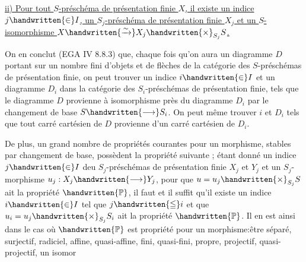 \uline{ii) Pour tout $S$-préschéma de présentation finie $X$, il existe un indice $j\handwritten{\in}I$,  un $S_j$-préschéma de présentation finie $X_j$ et un $S$-isomorphisme $X\handwritten{\xrightarrow{\sim}}X_j\handwritten{\times}_{S_j}S$.}

On en conclut (EGA IV 8.8.3) que, chaque fois qu'on aura un diagramme $D$ portant sur un nombre fini d'objets et de flèches de la catégorie des $S$-préschémas de présentation finie, on peut trouver un indice $i\handwritten{\in}I$ et un diagramme $D_i$ dans la catégorie des $S_i$-préschémas de présentation finie, tels que le diagramme $D$ provienne à isomorphisme près du diagramme $D_i$ par le changement de base $S\handwritten{\longrightarrow}S_i$. On peut même trouver $i$ et $D_i$ tels que tout carré cartésien de $D$ provienne d'un carré cartésien de $D_i$.

 De plus, un grand nombre de propriétés  courantes pour un morphisme, stables par changement de base, possèdent la propriété suivante ; étant donné un indice $j\handwritten{\in}I$ deu $S_j$-préschémas de présentation finie $X_j$ et $Y_j$ et un $S_j$-morphisme $u_j:X_j\handwritten{\longrightarrow}Y_j$, pour que $u=u_j\handwritten{\times}_{S_j}S$ ait la propriété $\handwritten{\mathbb{P}}$, il faut et il suffit qu'il existe un indice $i\handwritten{\in}I$ tel que $j\handwritten{\leqq}i$ et que $u_i=u_j\handwritten{\times}_{S_j}S_i$ ait la propriété $\handwritten{\mathbb{P}}$. Il en est ainsi dans le cas où $\handwritten{\mathbb{P}}$ est  propriété pour un morphisme:être séparé, surjectif, radiciel, affine, quasi-affine, fini, quasi-fini, propre, projectif, quasi-projectif, un isomor%
